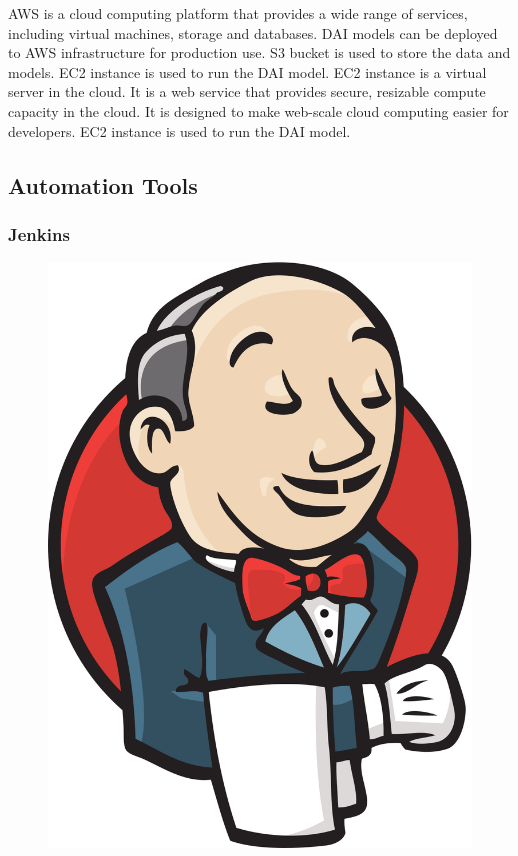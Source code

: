 \documentclass[12pt,a4paper]{report}
\begin{document}
\ac{AWS}\cite{noauthor_cloud_nodate} is a cloud computing platform that provides a wide range of services, including virtual machines, storage and databases. \ac{DAI} models can be deployed to AWS infrastructure for production use. S3 bucket is used to store the data and models. EC2 instance is used to run the \ac{DAI} model. EC2 instance is a virtual server in the cloud. It is a web service that provides secure, resizable compute capacity in the cloud. It is designed to make web-scale cloud computing easier for developers. EC2 instance is used to run the \ac{DAI} model. 

\subsection{Automation Tools}

\subsubsection*{Jenkins}

\begin{figure}
\includegraphics[width=1\linewidth]{jenkins.png}
\end{figure}
\end{document}
